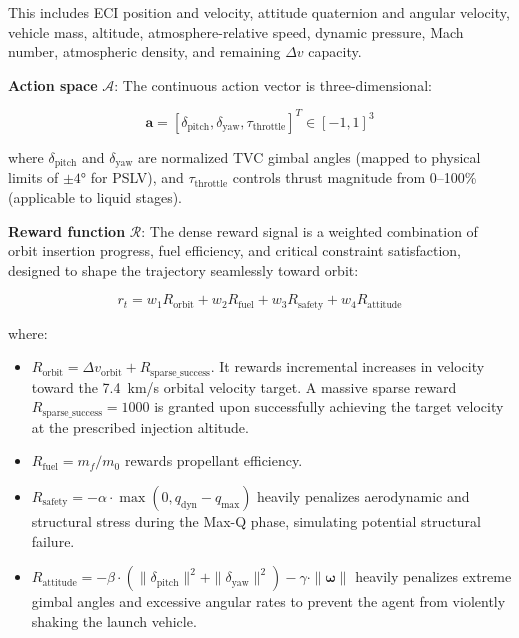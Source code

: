 \documentclass[conference]{IEEEtran}
\newcommand{\vect}[1]{\boldsymbol{#1}}
\begin{document}
\noindent This includes ECI position and velocity, attitude quaternion and angular velocity, vehicle mass, altitude, atmosphere-relative speed, dynamic pressure, Mach number, atmospheric density, and remaining $\Delta v$ capacity.

\textbf{Action space} $\mathcal{A}$: The continuous action vector is three-dimensional:

\begin{equation}
    \vect{a} = [\delta_{\text{pitch}}, \delta_{\text{yaw}}, \tau_{\text{throttle}}]^T \in [-1, 1]^3
    \label{eq:action_space}
\end{equation}

\noindent where $\delta_{\text{pitch}}$ and $\delta_{\text{yaw}}$ are normalized TVC gimbal angles (mapped to physical limits of $\pm 4°$ for PSLV), and $\tau_{\text{throttle}}$ controls thrust magnitude from 0--100\% (applicable to liquid stages).

\textbf{Reward function} $\mathcal{R}$: The dense reward signal is a weighted combination of orbit insertion progress, fuel efficiency, and critical constraint satisfaction, designed to shape the trajectory seamlessly toward orbit:

\begin{equation}
    r_t = w_1 R_{\text{orbit}} + w_2 R_{\text{fuel}} + w_3 R_{\text{safety}} + w_4 R_{\text{attitude}}
    \label{eq:reward}
\end{equation}

\noindent where:
\begin{itemize}
    \item $R_{\text{orbit}} = \Delta v_{\text{orbit}} + R_{\text{sparse\_success}}$. It rewards incremental increases in velocity toward the 7.4~km/s orbital velocity target. A massive sparse reward $R_{\text{sparse\_success}} = 1000$ is granted upon successfully achieving the target velocity at the prescribed injection altitude.
    \item $R_{\text{fuel}} = m_f / m_0$ rewards propellant efficiency.
    \item $R_{\text{safety}} = - \alpha \cdot \max(0, q_{\text{dyn}} - q_{\max})$ heavily penalizes aerodynamic and structural stress during the Max-Q phase, simulating potential structural failure.
    \item $R_{\text{attitude}} = - \beta \cdot (\|\delta_{\text{pitch}}\|^2 + \|\delta_{\text{yaw}}\|^2) - \gamma \cdot \|\vect{\omega}\|$ heavily penalizes extreme gimbal angles and excessive angular rates to prevent the agent from violently shaking the launch vehicle.
\end{itemize}
\end{document}
